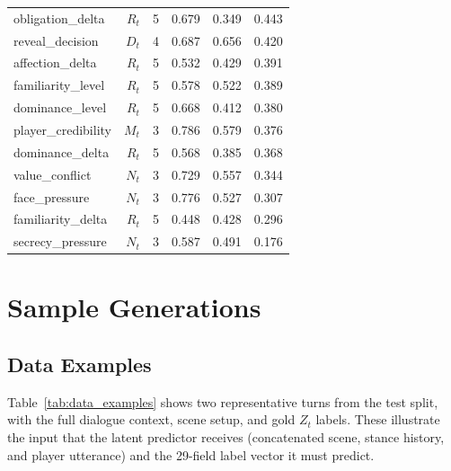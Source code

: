 \documentclass[11pt]{article}
\begin{document}
\begin{table}[h]
\begin{tabular}{@{}lrrrrr@{}}
obligation\_delta & $R_t$ & 5  & 0.679 & 0.349 & 0.443 \\
reveal\_decision  & $D_t$ & 4  & 0.687 & 0.656 & 0.420 \\
affection\_delta  & $R_t$ & 5  & 0.532 & 0.429 & 0.391 \\
familiarity\_level& $R_t$ & 5  & 0.578 & 0.522 & 0.389 \\
dominance\_level  & $R_t$ & 5  & 0.668 & 0.412 & 0.380 \\
player\_credibility & $M_t$ & 3 & 0.786 & 0.579 & 0.376 \\
dominance\_delta  & $R_t$ & 5  & 0.568 & 0.385 & 0.368 \\
value\_conflict   & $N_t$ & 3  & 0.729 & 0.557 & 0.344 \\
face\_pressure    & $N_t$ & 3  & 0.776 & 0.527 & 0.307 \\
familiarity\_delta& $R_t$ & 5  & 0.448 & 0.428 & 0.296 \\
secrecy\_pressure & $N_t$ & 3  & 0.587 & 0.491 & 0.176 \\
\bottomrule
\end{tabular}
\end{table}

\section{Sample Generations}
\label{app:samples}

\subsection{Data Examples}
\label{app:data_examples}

Table~\ref{tab:data_examples} shows two representative turns from the test split, with the full dialogue context, scene setup, and gold $Z_t$ labels.
These illustrate the input that the latent predictor receives (concatenated scene, stance history, and player utterance) and the 29-field label vector it must predict.
\end{document}
